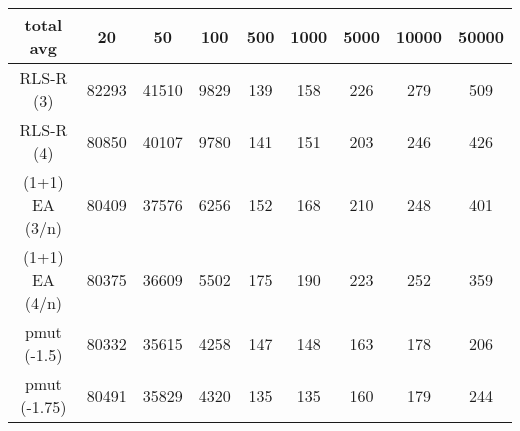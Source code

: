 \begin{tabular}[h]{ccccccccc}
total avg&20&50&100&500&1000&5000&10000&50000\\\hline
RLS-R (3)&82293&41510&9829&139&158&226&279&509\\
RLS-R (4)&80850&40107&9780&141&151&203&246&426\\
(1+1) EA (3/n)&80409&37576&6256&152&168&210&248&401\\
(1+1) EA (4/n)&80375&36609&5502&175&190&223&252&359\\
pmut (-1.5)&80332&35615&4258&147&148&163&178&206\\
pmut (-1.75)&80491&35829&4320&135&135&160&179&244\\
\end{tabular}

